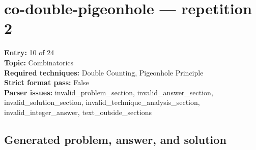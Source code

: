 \documentclass[11pt]{article}
\begin{document}
\section{co-double-pigeonhole --- repetition 2}
{\color{metadata}
\textbf{Entry:} 10 of 24\\
\textbf{Topic:} Combinatorics\\
\textbf{Required techniques:} Double Counting, Pigeonhole Principle\\
\textbf{Strict format pass:} False\\
\textbf{Parser issues:} invalid\_problem\_section, invalid\_answer\_section, invalid\_solution\_section, invalid\_technique\_analysis\_section, invalid\_integer\_answer, text\_outside\_sections
}

\subsection*{Generated problem, answer, and solution}
\end{document}
